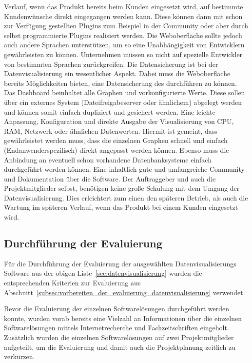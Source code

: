 \begin{outline}
  Verlauf, wenn das Produkt bereits beim Kunden eingesetzt wird, auf bestimmte
  Kundenwünsche direkt eingegangen werden kann. Diese können dann mit schon zur
  Verfügung gestellten Plugins zum Beispiel in der Community oder aber durch
  selbst programmierte Plugins realisiert werden. Die Weboberfläche sollte
  jedoch auch andere Sprachen unterstützen, um so eine Unabhängigkeit von
  Entwicklern gewährleisten zu können. Unternehmen müssen so nicht auf
  spezielle Entwickler von bestimmten Sprachen zurückgreifen.
  \1 Die Datensicherung ist bei der Datenvisualisierung ein wesentlicher
  Aspekt. Dabei muss die Weboberfläche bereits Möglichkeiten bieten, eine
  Datensicherung des  durchführen zu können. Das
  Dashboard beinhaltet alle Graphen und vorkonfigurierte Werte. Diese sollen
  über ein externes System (Dateifreigabeserver oder ähnlichem) abgelegt werden
  und können somit einfach dupliziert und gesichert werden.
  \1 Eine leichte Anpassung, Konfiguration und direkte Ausgabe der
  Visualisierung von CPU, RAM, Netzwerk oder ähnlichen Datenwerten. Hiermit ist
  gemeint, dass gewährleistet werden muss, dass die einzelnen Graphen schnell
  und einfach (Endanwenderspezifisch) direkt angepasst werden können. Ebenso
  muss die Anbindung an eventuell schon vorhandene Datenbanksysteme einfach
  durchgeführt werden können.
  \1 Eine inhaltlich gute und umfangreiche Community und Dokumentation über die
  Software. Der Auftraggeber und auch die Projektmitglieder selbst, benötigen
  keine große Schulung mit dem Umgang der Datenvisualisierung. Dies erleichtert
  zum einen den späteren Betrieb, als auch die Wartung im späteren Verlauf,
  wenn das Produkt bei einem Kunden eingesetzt wird.
\end{outline}
\mr%

\subsection{Durchführung der Evaluierung}
\label{subsec:durchfuehrung_evaluierung_datenvisualisierung}
Für die Durchführung der Evaluierung der ausgewählten Datenvisualisierungs
Software aus der obigen Liste~\ref{sec:datenvisualisierung} wurden die
entsprechenden Kriterien zur Evaluierung aus
Abschnitt~\ref{subsec:vorbereiten_der_evaluierung_datenvisualisierung}
verwendet.


Bevor die Evaluierung der einzelnen Softwarelösungen durchgeführt werden
konnte, wurden vorab bereits eine Vielzahl an Informationen über die einzelnen
Softwarelösungen mittels Internetrecherche und Fachzeitschriften eingeholt.
Zusätzlich wurden die einzelnen Softwarelösungen auf zwei Projektmitglieder
aufgeteilt, um die Evaluierung und damit auch die Projektplanung zeitlich zu
verkürzen.

